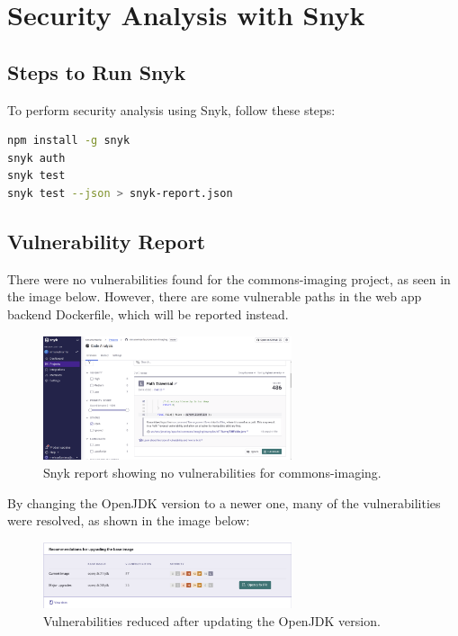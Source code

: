 \documentclass[a4paper,12pt]{report}
\begin{document}
\newpage


\chapter{Security Analysis with Snyk}

\section{Steps to Run Snyk}
To perform security analysis using Snyk, follow these steps:

\begin{lstlisting}[language=bash]
npm install -g snyk
snyk auth
snyk test
snyk test --json > snyk-report.json
\end{lstlisting}

\section{Vulnerability Report}
There were no vulnerabilities found for the commons-imaging project, as seen in the image below. However, there are some vulnerable paths in the web app backend Dockerfile, which will be reported instead.

\begin{figure}[H]
    \centering
    \includegraphics[width=0.65\textwidth]{Report_Img/synk.png}
    \caption{Snyk report showing no vulnerabilities for commons-imaging.}
    \label{fig:snyk-report}
\end{figure}

By changing the OpenJDK version to a newer one, many of the vulnerabilities were resolved, as shown in the image below:

\begin{figure}[H]
    \centering
    \includegraphics[width=0.65\textwidth]{Report_Img/synk_backend.png}
    \caption{Vulnerabilities reduced after updating the OpenJDK version.}
    \label{fig:openjdk-update}
\end{figure}
\end{document}
